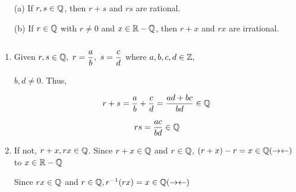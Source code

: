 $ $

\begin{enumerate}[wide]
	\item[(a)] If $r,s \in \mathbb{Q}$, then $r+s$ and $rs$ are rational.
	\item[(b)] If $r \in \mathbb{Q}$ with $r \neq 0$ and $x \in \mathbb{R} - \mathbb{Q}$, then $r+x$ and $rx$ are irrational.
\end{enumerate}

\begin{tcolorbox}
	\begin{solution}$ $ 
		\begin{enumerate}
			\item Given $r,s \in \mathbb{Q} ,~r = \dfrac{a}{b},~s = \dfrac{c}{d}$ where $a,b,c,d \in \mathbb{Z},$
			
			$b,d \neq 0.$ Thus,
			
			$$r + s = \dfrac{a}{b} + \dfrac{c}{d} = \dfrac{ad+bc}{bd} \in \mathbb{Q}$$
			
			$$rs = \dfrac{ac}{bd} \in \mathbb{Q}$$
			
			\item If not, $r+x,rx \in \mathbb{Q}$. Since $r+x \in \mathbb{Q}$ and $r \in \mathbb{Q}$, $(r+x) - r = x \in \mathbb{Q} (\rightarrow \leftarrow)$ to $x \in \mathbb{R} - \mathbb{Q}$
			
			Since $rx \in \mathbb{Q}$ and $r \in \mathbb{Q}, r^{-1}(rx) = x \in \mathbb{Q} (\rightarrow\leftarrow)$
		\end{enumerate}
	\end{solution}
\end{tcolorbox}